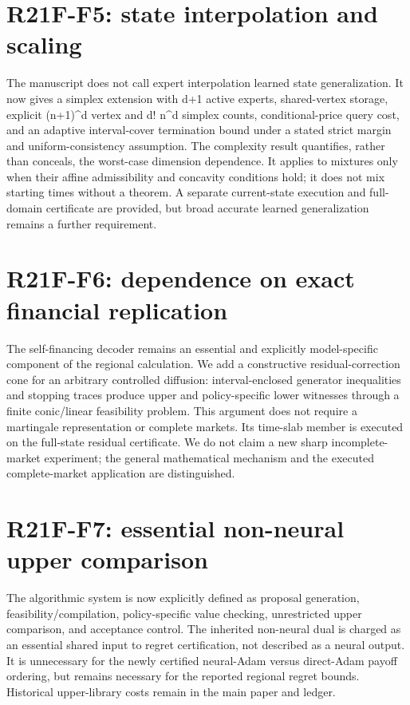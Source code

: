 \documentclass[ecta]{econsocart}
\theoremstyle{remark}
\begin{document}
\section{R21F-F5: state interpolation and scaling}

The manuscript does not call expert interpolation learned state generalization. It now gives a simplex extension with d+1 active experts, shared-vertex storage, explicit (n+1)\textasciicircum{}d vertex and d! n\textasciicircum{}d simplex counts, conditional-price query cost, and an adaptive interval-cover termination bound under a stated strict margin and uniform-consistency assumption. The complexity result quantifies, rather than conceals, the worst-case dimension dependence. It applies to mixtures only when their affine admissibility and concavity conditions hold; it does not mix starting times without a theorem. A separate current-state execution and full-domain certificate are provided, but broad accurate learned generalization remains a further requirement.

\section{R21F-F6: dependence on exact financial replication}

The self-financing decoder remains an essential and explicitly model-specific component of the regional calculation. We add a constructive residual-correction cone for an arbitrary controlled diffusion: interval-enclosed generator inequalities and stopping traces produce upper and policy-specific lower witnesses through a finite conic/linear feasibility problem. This argument does not require a martingale representation or complete markets. Its time-slab member is executed on the full-state residual certificate. We do not claim a new sharp incomplete-market experiment; the general mathematical mechanism and the executed complete-market application are distinguished.

\section{R21F-F7: essential non-neural upper comparison}

The algorithmic system is now explicitly defined as proposal generation, feasibility/compilation, policy-specific value checking, unrestricted upper comparison, and acceptance control. The inherited non-neural dual is charged as an essential shared input to regret certification, not described as a neural output. It is unnecessary for the newly certified neural-Adam versus direct-Adam payoff ordering, but remains necessary for the reported regional regret bounds. Historical upper-library costs remain in the main paper and ledger.
\end{document}
